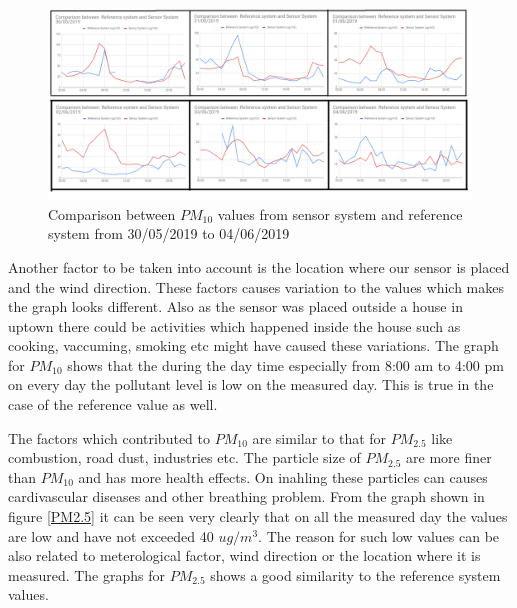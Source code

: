  
 \begin{figure}[h]
  \begin{center}
  \includegraphics[scale=0.70]{images/figure25.png}
  \end{center}
  \caption{Comparison between $PM_{10}$ values from sensor system and reference system from 30/05/2019 to 04/06/2019}
\label{PM10}
\end{figure}
\bigskip


  Another factor to be taken into account is  the location where our sensor is placed and the wind direction. These factors causes variation to the values which makes the graph looks different. Also as the sensor was placed outside a house in uptown there could be activities which happened inside the house such as cooking, vaccuming, smoking etc might have caused these variations. %
 The graph for $PM_{10}$ shows that the during the day time especially from 8:00 am to 4:00 pm on every day the pollutant level is low on the measured day. This is true in the case of the reference value as well.

The factors which contributed to $PM_{10}$ are similar to that for $PM_{2.5}$ like combustion, road dust, industries etc. The particle size of $PM_{2.5}$ are more finer than $PM_{10}$ and has more health effects. On inahling these particles can causes cardivascular diseases and other breathing problem. From the graph shown in figure \ref{PM2.5} it can be seen very clearly that on all the measured day the values are low and have not exceeded 40 $ug/m^3$. The reason for such low values can be also related to meterological factor, wind direction or the location where it is measured. The graphs for $PM_{2.5}$ shows a good similarity to the reference system values.



